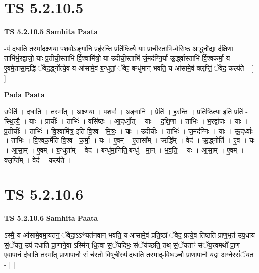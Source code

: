 \documentclass[17pt]{extarticle}
\begin{document}
\section*{ TS 5.2.10.5 }

\textbf{TS 5.2.10.5 } \newline
\textbf{Samhita Paata} \newline

-प॑ दधाति॒ तस्मा॑दक्ष्ण॒या प॒शवोऽङ्गा॑नि॒ प्रह॑रन्ति॒ प्रति॑ष्ठित्यै॒ याः प्राची॒स्ताभि॒-र्वसि॑ष्ठ आर्द्ध्नो॒द्या द॑क्षि॒णा ताभि॑र्भ॒रद्वा॑जो॒ याः प्र॒तीची॒स्ताभि॑ र्वि॒श्वामि॑त्रो॒ या उदी॑ची॒स्ताभि॑-र्ज॒मद॑ग्नि॒र्या ऊ॒र्द्ध्वास्ताभि॑-र्वि॒श्वक॑र्मा॒ य ए॒वमे॒तासा॒मृद्धिं॒ ॅवेद॒र्द्ध्नोत्ये॒व य आ॑सामे॒वं ब॒न्धुतां॒ ॅवेद॒ बन्धु॑मान् भवति॒ य आ॑सामे॒वं क्लृप्तिं॒ ॅवेद॒ कल्प॑ते - [  ] \newline

\textbf{Pada Paata} \newline

उपेति॑ । द॒धा॒ति॒ । तस्मा᳚त् । अ॒क्ष्ण॒या । प॒शवः॑ । अङ्गा॑नि । प्रेति॑ । ह॒र॒न्ति॒ । प्रति॑ष्ठित्या॒ इति॒ प्रति॑ - स्थि॒त्यै॒ । याः । प्राचीः᳚ । ताभिः॑ । वसि॑ष्ठः । आ॒द्‌र्ध्नो॒त् । याः । द॒क्षि॒णा । ताभिः॑ । भ॒रद्वा॑जः । याः । प्र॒तीचीः᳚ । ताभिः॑ । वि॒श्वामि॑त्र॒ इति॑ वि॒श्व - मि॒त्रः॒ । याः । उदी॑चीः । ताभिः॑ । ज॒मद॑ग्निः । याः । ऊ॒द्‌र्ध्वाः । ताभिः॑ । वि॒श्वक॒र्मेति॑ वि॒श्व - क॒र्मा॒ । यः । ए॒वम् । ए॒तासा᳚म् । ऋद्धि᳚म् । वेद॑ । ऋ॒द्ध्नोति॑ । ए॒व । यः । आ॒सा॒म् । ए॒वम् । ब॒न्धुता᳚म् । वेद॑ । बन्धु॑मा॒निति॒ बन्धु॑ - मा॒न् । भ॒व॒ति॒ । यः । आ॒सा॒म् । ए॒वम् । क्लृप्ति᳚म् । वेद॑ । कल्प॑ते ।  \newline




\section*{ TS 5.2.10.6 }

\textbf{TS 5.2.10.6 } \newline
\textbf{Samhita Paata} \newline

ऽस्मै॒ य आ॑सामे॒वमा॒यत॑नं॒ ॅवेदा॒ऽऽ*यत॑नवान् भवति॒ य आ॑सामे॒वं प्र॑ति॒ष्ठां ॅवेद॒ प्रत्ये॒व ति॑ष्ठति प्राण॒भृत॑ उप॒धाय॑ सं॒ॅयत॒ उप॑ दधाति प्रा॒णाने॒वा ऽस्मि॑न् धि॒त्वा सं॒ॅयद्भिः॒ संॅय॑च्छति॒ तथ् सं॒ॅयताꣳ॑ संॅय॒त्त्वमथो᳚ प्रा॒ण ए॒वापा॒नं द॑धाति॒ तस्मा᳚त् प्राणापा॒नौ सं च॑रतो॒ विषू॑ची॒रुप॑ दधाति॒ तस्मा॒द्-विष्व॑ञ्चौ प्राणापा॒नौ यद्वा अ॒ग्नेरसं॑ॅयत॒ - [  ] \newline
\end{document}
